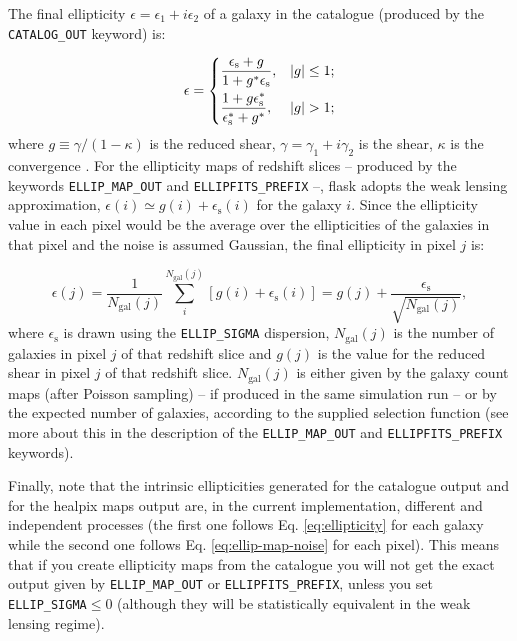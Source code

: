 \documentclass[12pt]{book} %
\newcommand{\nv}[1]{\mathrm{#1}}                 %
\begin{document}
\begin{itemize}
  The final ellipticity $\epsilon=\epsilon_1+i\epsilon_2$ of a galaxy in the catalogue (produced by the 
  {\tt CATALOG\_OUT} keyword) is:
  
  \begin{equation}
    \epsilon = 
    \begin{dcases}
      \frac{\epsilon_{\nv{s}}+g}{1+g^{*}\epsilon_{\nv{s}}}, & |g|\leq 1; \\
      \frac{1+g\epsilon_{\nv{s}}^{*}}{\epsilon_{\nv{s}}^{*}+g^{*}}, & |g|>1;\\
    \end{dcases}
    \label{eq:ellipticity}
  \end{equation}
  where $g\equiv \gamma/(1-\kappa)$ is the reduced shear, $\gamma=\gamma_1+i\gamma_2$ is the shear, $\kappa$ is the 
  convergence \citep[we follow ][eq. 4.12]{Bartelmann01mn}. 
  For the ellipticity maps of redshift slices -- produced by the keywords {\tt ELLIP\_MAP\_OUT} and 
  {\tt ELLIPFITS\_PREFIX} --, {\sc flask} adopts the weak lensing approximation, 
  $\epsilon(i) \simeq g(i) + \epsilon_{\nv{s}}(i)$ for the galaxy $i$. Since the ellipticity value 
  in each pixel would be the average over the ellipticities of the galaxies in that pixel 
  and the noise is assumed Gaussian, the final ellipticity in pixel $j$ is:

  \begin{equation}
    \epsilon(j) = \frac{1}{N_{\nv{gal}}(j)}\sum_i^{N_{\nv{gal}}(j)} \left[ g(i)+\epsilon_{\nv{s}}(i) \right] 
    = g(j) + \frac{\epsilon_{\nv{s}}}{\sqrt{N_{\nv{gal}}(j)}},
    \label{eq:ellip-map-noise}
  \end{equation}
  where $\epsilon_{\nv{s}}$ is drawn using the {\tt ELLIP\_SIGMA} dispersion, $N_{\nv{gal}}(j)$ is 
  the number of galaxies in pixel $j$ of that redshift slice and $g(j)$ is the value for the 
  reduced shear in pixel $j$ of that redshift slice. $N_{\nv{gal}}(j)$ is either given by the galaxy 
  count maps (after Poisson sampling) -- if produced in the same simulation run -- or by the expected 
  number of galaxies, according to the supplied selection function (see more about this in the 
  description of the {\tt ELLIP\_MAP\_OUT} and {\tt ELLIPFITS\_PREFIX} keywords). 
  
  Finally, note that the intrinsic ellipticities generated for the catalogue output and for the 
  {\sc healpix} maps output are, in the current implementation, different and independent processes 
  (the first one follows Eq. \ref{eq:ellipticity} for each galaxy while the second one follows Eq. 
  \ref{eq:ellip-map-noise} for each pixel). 
  This means that if you create ellipticity maps from the catalogue you will not get the exact output 
  given by {\tt ELLIP\_MAP\_OUT} or {\tt ELLIPFITS\_PREFIX}, unless you set {\tt ELLIP\_SIGMA}$\leq 0$ 
  (although they will be statistically equivalent in the weak lensing regime).
  

\end{itemize}
\end{document}
